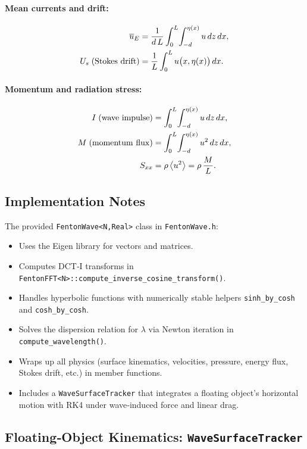 \documentclass[11pt,letterpaper]{article}
\begin{document}
\paragraph{Mean currents and drift:}
\begin{align}
\overline{u}_{E} 
&= \frac{1}{d\,L}\int_{0}^{L}\!\int_{-d}^{\eta(x)} u\,dz\,dx, 
\\
U_{s}\;({\rm Stokes\ drift})
&= \frac{1}{L}\int_{0}^{L} u\bigl(x,\eta(x)\bigr)\,dx.
\end{align}

\paragraph{Momentum and radiation stress:}
\begin{align}
I\;({\rm wave\ impulse})
&= \int_{0}^{L}\!\int_{-d}^{\eta(x)} u\,dz\,dx, 
\\
M\;({\rm momentum\ flux})
&= \int_{0}^{L}\!\int_{-d}^{\eta(x)} u^{2}\,dz\,dx, 
\\
S_{xx}
&= \rho\,\bigl\langle u^{2}\bigr\rangle
   = \rho\,\frac{M}{L}.
\end{align}

\subsection{Implementation Notes}

The provided \verb|FentonWave<N,Real>| class in \texttt{FentonWave.h}:
\begin{itemize}
  \item Uses the Eigen library for vectors and matrices.
  \item Computes DCT‐I transforms in \verb|FentonFFT<N>::compute_inverse_cosine_transform()|.
  \item Handles hyperbolic functions with numerically stable helpers \verb|sinh_by_cosh| and \verb|cosh_by_cosh|.
  \item Solves the dispersion relation for $\lambda$ via Newton iteration in \verb|compute_wavelength()|.
  \item Wraps up all physics (surface kinematics, velocities, pressure, energy flux, Stokes drift, etc.) in member functions.
  \item Includes a \verb|WaveSurfaceTracker| that integrates a floating object’s horizontal motion with RK4 under wave‐induced force and linear drag.
\end{itemize}

\subsection{Floating‐Object Kinematics: \texttt{WaveSurfaceTracker}}
\label{sec:wave_surface_tracker}
\end{document}
